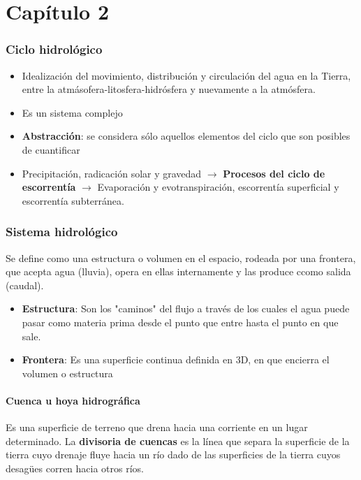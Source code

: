 \part{Capítulo 2}
\section{Ciclo hidrológico}
\begin{itemize}
    \item Idealización del movimiento, distribución y circulación del agua en la Tierra, entre la atmásofera-litosfera-hidrósfera y nuevamente a la atmósfera.
    \item Es un sistema complejo
    \item \textbf{Abstracción}: se considera sólo aquellos elementos del ciclo que son posibles de cuantificar
    \item Precipitación, radicación solar y gravedad $\rightarrow$ \textbf{Procesos del ciclo de escorrentía} $\rightarrow$ Evaporación y evotranspiración, escorrentía superficial y escorrentía subterránea.
\end{itemize}

\section{Sistema hidrológico}
Se define como una estructura o volumen en el espacio, rodeada por una frontera, que acepta agua (lluvia), opera en ellas internamente y las produce ccomo salida (caudal).

\begin{itemize}
    \item \textbf{Estructura}: Son los "caminos" del flujo a través de los cuales el agua puede pasar como materia prima desde el punto que entre hasta el punto en que sale.
    \item \textbf{Frontera}: Es una superficie continua definida en 3D, en que encierra el volumen o estructura
\end{itemize}

\subsection{Cuenca u hoya hidrográfica}
Es una superficie de terreno que drena hacia una corriente en un lugar determinado. La \textbf{divisoria de cuencas} es la línea que separa la superficie de la tierra cuyo drenaje fluye hacia un río dado de las superficies de la tierra cuyos desagües corren hacia otros ríos.

